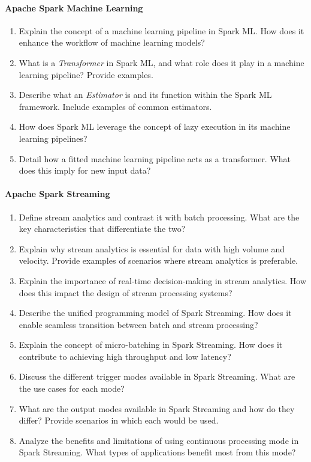 \paragraph*{Apache Spark Machine Learning}
\begin{enumerate}
    \item Explain the concept of a machine learning pipeline in Spark ML. How does it enhance the workflow of machine learning models?
    \item What is a \emph{Transformer} in Spark ML, and what role does it play in a machine learning pipeline? Provide examples.
    \item Describe what an \emph{Estimator} is and its function within the Spark ML framework. Include examples of common estimators.
	\item How does Spark ML leverage the concept of lazy execution in its machine learning pipelines?
    \item Detail how a fitted machine learning pipeline acts as a transformer. What does this imply for new input data?
\end{enumerate}
\paragraph*{Apache Spark Streaming}
\begin{enumerate}
	\item Define stream analytics and contrast it with batch processing. What are the key characteristics that differentiate the two?
	\item Explain why stream analytics is essential for data with high volume and velocity. Provide examples of scenarios where stream analytics is preferable.
	\item Explain the importance of real-time decision-making in stream analytics. How does this impact the design of stream processing systems?
	\item Describe the unified programming model of Spark Streaming. How does it enable seamless transition between batch and stream processing?
	\item Explain the concept of micro-batching in Spark Streaming. How does it contribute to achieving high throughput and low latency?
	\item Discuss the different trigger modes available in Spark Streaming. What are the use cases for each mode?
	\item What are the output modes available in Spark Streaming and how do they differ? Provide scenarios in which each would be used.
	\item Analyze the benefits and limitations of using continuous processing mode in Spark Streaming. What types of applications benefit most from this mode?
\end{enumerate}
